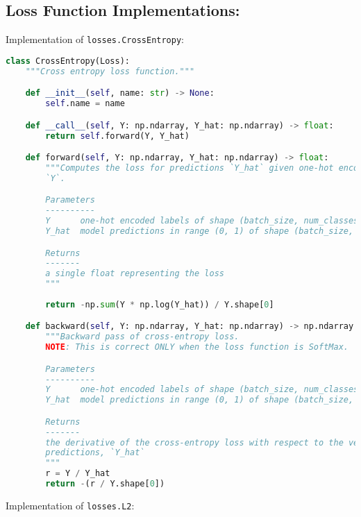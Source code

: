 \subsection{Loss Function Implementations:}

Implementation of \texttt{losses.CrossEntropy}:

\begin{lstlisting}[language=Python]
class CrossEntropy(Loss):
    """Cross entropy loss function."""

    def __init__(self, name: str) -> None:
        self.name = name

    def __call__(self, Y: np.ndarray, Y_hat: np.ndarray) -> float:
        return self.forward(Y, Y_hat)

    def forward(self, Y: np.ndarray, Y_hat: np.ndarray) -> float:
        """Computes the loss for predictions `Y_hat` given one-hot encoded labels
        `Y`.

        Parameters
        ----------
        Y      one-hot encoded labels of shape (batch_size, num_classes)
        Y_hat  model predictions in range (0, 1) of shape (batch_size, num_classes)

        Returns
        -------
        a single float representing the loss
        """
        
        return -np.sum(Y * np.log(Y_hat)) / Y.shape[0]

    def backward(self, Y: np.ndarray, Y_hat: np.ndarray) -> np.ndarray:
        """Backward pass of cross-entropy loss.
        NOTE: This is correct ONLY when the loss function is SoftMax.

        Parameters
        ----------
        Y      one-hot encoded labels of shape (batch_size, num_classes)
        Y_hat  model predictions in range (0, 1) of shape (batch_size, num_classes)

        Returns
        -------
        the derivative of the cross-entropy loss with respect to the vector of
        predictions, `Y_hat`
        """
        r = Y / Y_hat
        return -(r / Y.shape[0])

\end{lstlisting}

Implementation of \texttt{losses.L2}:

